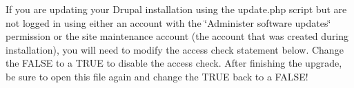 If you are updating your Drupal installation using the update.php script but are not logged in using either an account with the \char`\"{}Administer software
 updates\char`\"{} permission or the site maintenance account (the account that was created during installation), you will need to modify the access check statement below. Change the FALSE to a TRUE to disable the access check. After finishing the upgrade, be sure to open this file again and change the TRUE back to a FALSE! 